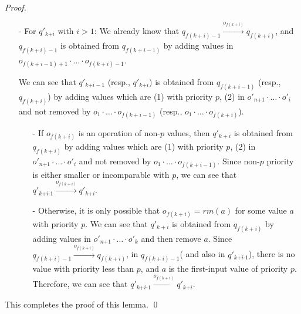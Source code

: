 \begin {proof}
\begin{itemize}
    \begin{itemize}
    \setlength{\itemsep}{0.5pt}
    \item[-] If $o_{f(k+1)}$ is an operation of non-$p$ values, then $q'_{k+1}$ is obtained from $q_{f(k+1)}$ by adding values in $o'_{\textit{n+1}} \cdot \ldots \cdot o'_i$. Since non-$p$ priority is either smaller or incomparable with $p$, we can see that $q'_k \xrightarrow{o_{f(k+1)}} q'_{\textit{k+1}}$.

    \item[-] Otherwise, it is only possible that $o_{f(k+1)} = \textit{rm}(a)$ for some value $a$ with priority $p$. We can see that $q'_{k+1}$ is obtained from $q_{f(k+1)}$ by adding values in $o'_{\textit{n+1}} \cdot \ldots \cdot o'_k$ and then remove $a$. Since $q_{f(k+1)-1} \xrightarrow{o_{f(k+1)}} q_{f(k+1)}$, in $q_{f(k+1)-1}$( and also in $q'_k$), there is no value with priority less than $p$, and $a$ is the first-input value of priority $p$. Therefore, we can see that $q'_k \xrightarrow{o_{f(k+1)}} q'_{\textit{k+1}}$.
    \end{itemize}

\item[-] For $q'_{\textit{k+i}}$ with $i>1$: We already know that $q_{f(k+i)-1} \xrightarrow{o_{f(k+i)}} q_{f(k+i)}$, and $q_{f(k+i)-1}$ is obtained from $q_{f(k+i-1)}$ by adding values in $o_{f(k+i-1)+1} \cdot \ldots \cdot o_{f(k+i)-1}$.

    We can see that $q'_{\textit{k+i}-1}$ (resp., $q'_{\textit{k+i}}$) is obtained from $q_{f(k+i-1)}$ (resp., $q_{f(k+i)}$) by adding values which are (1) with priority $p$, (2) in $o'_{\textit{n+1}} \cdot \ldots \cdot o'_i$ and not removed by $o_1 \cdot \ldots \cdot o_{f(k+i-1)}$ (resp., $o_1 \cdot \ldots \cdot o_{f(k+i)}$).

    \begin{itemize}
    \setlength{\itemsep}{0.5pt}
    \item[-] If $o_{f(k+i)}$ is an operation of non-$p$ values, then $q'_{k+i}$ is obtained from $q_{f(k+i)}$ by adding values which are (1) with priority $p$, (2) in $o'_{\textit{n+1}} \cdot \ldots \cdot o'_i$ and not removed by $o_1 \cdot \ldots \cdot o_{f(k+i-1)}$. Since non-$p$ priority is either smaller or incomparable with $p$, we can see that $q'_{\textit{k+i-1}} \xrightarrow{o_{f(k+i)}} q'_{\textit{k+i}}$.

    \item[-] Otherwise, it is only possible that $o_{f(k+i)} = \textit{rm}(a)$ for some value $a$ with priority $p$. We can see that $q'_{k+i}$ is obtained from $q_{f(k+i)}$ by adding values in $o'_{\textit{n+1}} \cdot \ldots \cdot o'_k$ and then remove $a$. Since $q_{f(k+i)-1} \xrightarrow{o_{f(k+i)}} q_{f(k+i)}$, in $q_{f(k+i)-1}$( and also in $q'_{\textit{k+i-1}}$), there is no value with priority less than $p$, and $a$ is the first-input value of priority $p$. Therefore, we can see that $q'_{\textit{k+i-1}} \xrightarrow{o_{f(k+i)}} q'_{\textit{k+i}}$.
    \end{itemize}
\end{itemize}

This completes the proof of this lemma. \qed
\end {proof}
